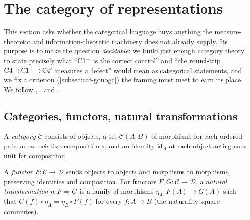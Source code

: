 \section{The category of representations}
\label{sec:category}

%

This section asks whether the categorical language buys anything the
measure-theoretic and information-theoretic machinery does not already supply.
Its purpose is to make the question \emph{decidable}: we build just enough
category theory to state precisely what ``$\mathrm{C1^{+}}$ is the correct
control'' and ``the round-trip $\mathrm{C}4 \!\to\! \mathrm{C1^{+}} \!\to\! \mathrm{C}4'$ measures a
defect'' would mean as categorical statements, and we fix a criterion
(\cref{subsec:cat-gonogo}) the framing must meet to earn its place. We follow
\citet{maclane1998}, \citet{riehl2016}, and \citet{awodey2010}.

\subsection{Categories, functors, natural transformations}
\label{subsec:cat-basics}

\begin{definition}[Category]
\label{def:category}
A \emph{category} $\mathcal{C}$ consists of objects, a set
$\mathcal{C}(A,B)$ of morphisms for each ordered pair, an associative
composition $\circ$, and an identity $\mathrm{id}_A$ at each object acting as
a unit for composition.
\end{definition}

\begin{definition}
\label{def:functor}
A \emph{functor} $F:\mathcal{C}\to\mathcal{D}$ sends objects to objects and
morphisms to morphisms, preserving identities and composition. For functors
$F,G:\mathcal{C}\to\mathcal{D}$, a \emph{natural transformation}
$\eta:F\Rightarrow G$ is a family of morphisms
$\eta_A:F(A)\to G(A)$ such that
$G(f)\circ\eta_A=\eta_B\circ F(f)$ for every $f:A\to B$ (the naturality
square commutes).
\end{definition}

